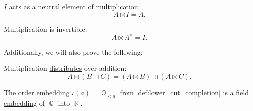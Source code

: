 \begin{proposition}
\begin{thmenum}[resume=thm:field_of_real_numbers]
      \( I \) acts as a neutral element of multiplication:
    \begin{equation}\label{eq:thm:field_of_real_numbers/multiplication_neutral}
      A \boxtimes I = A.
    \end{equation}

     Multiplication is invertible:
    \begin{equation}\label{eq:thm:field_of_real_numbers/multiplication_invertible}
      A \boxtimes A^\boxast = I.
    \end{equation}
  \end{thmenum}

  Additionally, we will also prove the following:
  \begin{thmenum}[resume=thm:field_of_real_numbers]
     Multiplication \hyperref[def:semiring]{distributes} over addition:
    \begin{equation}\label{eq:thm:field_of_real_numbers/distributivity}
      A \boxtimes (B \boxplus C) = (A \boxtimes B) \boxplus (A \boxtimes C).
    \end{equation}

     The \hyperref[def:partially_ordered_set/morphism]{order embedding} \( \iota(a) = \BbbQ_{<a} \) from \cref{def:lower_cut_completion} is a \hyperref[def:field/morphism]{field embedding} of \( \BbbQ \) into \( \BbbR \).
  \end{thmenum}
\end{proposition}
